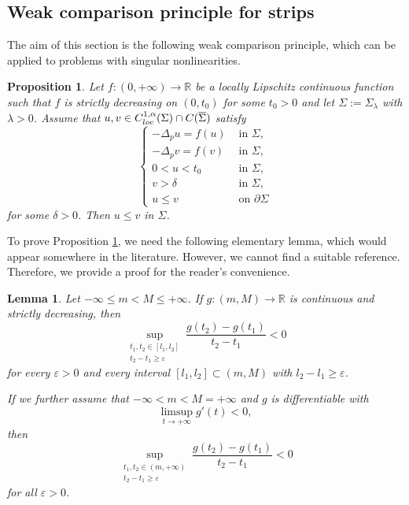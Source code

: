 \documentclass[reqno]{amsart}
\theoremstyle{plain}
\newtheorem{proposition}[theorem]{Proposition}
\newtheorem{lemma}[theorem]{Lemma}
\theoremstyle{definition}
\theoremstyle{remark}
\begin{document}
	\subsection{Weak comparison principle for strips}
	The aim of this section is the following weak comparison principle, which can be applied to problems with singular nonlinearities.
	\begin{proposition}\label{prop:wcp}
		Let $f:(0,+\infty)\to\mathbb{R}$ be a locally Lipschitz continuous function such that $f$ is strictly decreasing on $(0,t_0)$ for some $t_0>0$ and let $\Sigma := \Sigma_{\lambda}$ with $\lambda>0$. Assume that $u, v \in C^{1,\alpha}_{\rm loc}(\Sigma) \cap C(\overline{\Sigma})$ satisfy
		\begin{equation}\label{ky}
			\begin{cases}
				-\Delta_p u = f(u) &\text{ in } \Sigma,\\
				-\Delta_p v = f(v) &\text{ in } \Sigma,\\
				0<u<t_0 &\text{ in } \Sigma,\\
				v>\delta &\text{ in } \Sigma,\\
				u \le v &\text{ on } \partial\Sigma
			\end{cases}
		\end{equation}
		for some $\delta>0$. Then $u\le v$ in $\Sigma$.
	\end{proposition}
	
	To prove Proposition \ref{prop:wcp}, we need the following elementary lemma, which would appear somewhere in the literature. However, we cannot find a suitable reference. Therefore, we provide a proof for the reader's convenience.
	\begin{lemma}\label{lem:k}
		Let $-\infty \le m < M \le +\infty$.
		If $g:(m,M)\to\mathbb{R}$ is continuous and strictly decreasing, then
		\begin{equation}\label{k1}
			\sup_{\substack{t_1,t_2\in[l_1,l_2]\\t_2-t_1\ge\varepsilon}} \frac{g(t_2)-g(t_1)}{t_2-t_1} < 0
		\end{equation}
		for every $\varepsilon>0$ and every interval $[l_1,l_2] \subset (m,M)$ with $l_2-l_1\ge\varepsilon$.
		
		If we further assume that $-\infty < m < M=+\infty$ and $g$ is differentiable with
		\begin{equation}\label{neg_deri}
			\limsup_{t\to+\infty} g'(t) < 0,
		\end{equation}
		then
		\begin{equation}\label{k2}
			\sup_{\substack{t_1,t_2\in(m,+\infty)\\t_2-t_1\ge\varepsilon}} \frac{g(t_2)-g(t_1)}{t_2-t_1} < 0
		\end{equation}
		for all $\varepsilon>0$.
	\end{lemma}
	
\end{document}
